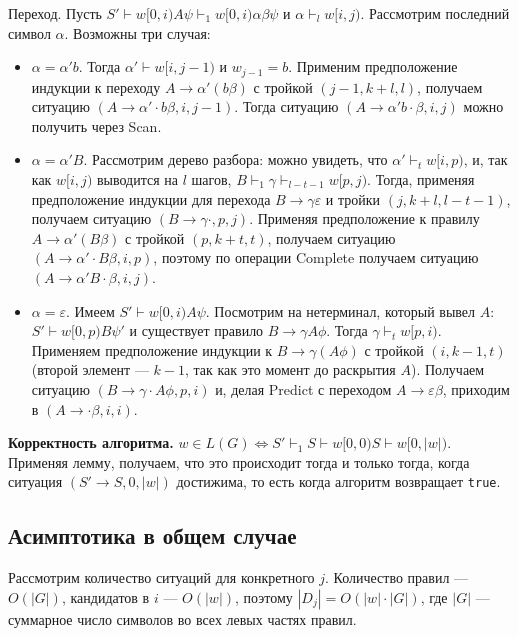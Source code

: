 Переход. Пусть $S' \vdash w[0,i) A \psi \vdash_1 w[0,i) \alpha \beta \psi$ и $\alpha \vdash_l w[i,j)$.
Рассмотрим последний символ $\alpha$. Возможны три случая:
\begin{itemize}
    \item $\alpha = \alpha' b$. Тогда $\alpha' \vdash w[i,j-1)$ и $w_{j-1} = b$.
        Применим предположение индукции к переходу $A \to \alpha' (b\beta)$ с тройкой $(j - 1, k + l, l)$, получаем ситуацию $(A \to \alpha' \cdot b \beta, i, j - 1)$.
        Тогда ситуацию $(A \to \alpha' b \cdot \beta, i, j)$ можно получить через Scan.
    \item $\alpha = \alpha' B$. Рассмотрим дерево разбора: можно увидеть, что $\alpha' \vdash_t w[i,p)$, и, так как $w[i,j)$ выводится на $l$ шагов, $B \vdash_1 \gamma \vdash_{l-t-1} w[p,j)$.
        Тогда, применяя предположение индукции для перехода $B \to \gamma \varepsilon$ и тройки $(j, k + l, l - t - 1)$, получаем ситуацию $(B \to \gamma \cdot, p, j)$.
        Применяя предположение к правилу $A \to \alpha' (B \beta)$ с тройкой $(p, k + t, t)$, получаем ситуацию $(A \to \alpha' \cdot B \beta, i, p)$, поэтому по операции Complete получаем ситуацию $(A \to \alpha'B \cdot \beta, i, j)$.
    \item $\alpha = \varepsilon$. Имеем $S' \vdash w[0, i)A \psi$. Посмотрим на нетерминал, который вывел $A$: $S' \vdash w[0, p) B \psi'$ и существует правило $B \to \gamma A \phi$.
        Тогда $\gamma \vdash_t w[p, i)$.
        Применяем предположение индукции к $B \to \gamma (A\phi)$ с тройкой $(i, k - 1, t)$ (второй элемент --- $k - 1$, так как это момент до раскрытия $A$).
        Получаем ситуацию $(B \to \gamma \cdot A \phi, p, i)$ и, делая Predict с переходом $A \to \varepsilon \beta$, приходим в $(A \to \cdot \beta, i, i)$.
\end{itemize}

\QED

\textbf{Корректность алгоритма.} $w \in L(G) \iff S' \vdash_1 S \vdash w[0,0)S \vdash w[0,|w|)$.
Применяя лемму, получаем, что это происходит тогда и только тогда, когда ситуация $(S' \to S, 0, |w|)$ достижима, то есть когда алгоритм возвращает \verb+true+.

\subsection{Асимптотика в общем случае}
Рассмотрим количество ситуаций для конкретного $j$.
Количество правил --- $O(|G|)$, кандидатов в $i$ --- $O(|w|)$, поэтому $|D_j| = O(|w| \cdot |G|)$, где $|G|$ --- суммарное число символов во всех левых частях правил.

